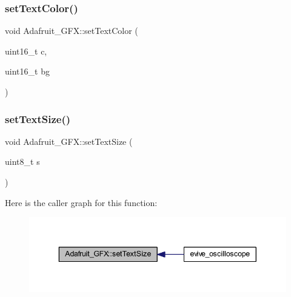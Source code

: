\subsubsection{\texorpdfstring{set\+Text\+Color()}{setTextColor()}\hspace{0.1cm}{\footnotesize\ttfamily [2/2]}}
{\footnotesize\ttfamily void Adafruit\+\_\+\+G\+F\+X\+::set\+Text\+Color (\begin{DoxyParamCaption}\item[{uint16\+\_\+t}]{c,  }\item[{uint16\+\_\+t}]{bg }\end{DoxyParamCaption})}

\mbox{\label{class_adafruit___g_f_x_a39eb4a8a2c9fa4ab7d58ceffd19535d5}} 
\subsubsection{\texorpdfstring{set\+Text\+Size()}{setTextSize()}}
{\footnotesize\ttfamily void Adafruit\+\_\+\+G\+F\+X\+::set\+Text\+Size (\begin{DoxyParamCaption}\item[{uint8\+\_\+t}]{s }\end{DoxyParamCaption})}

Here is the caller graph for this function\+:
\nopagebreak
\begin{figure}[H]
\begin{center}
\leavevmode
\includegraphics[width=343pt]{d9/d97/class_adafruit___g_f_x_a39eb4a8a2c9fa4ab7d58ceffd19535d5_icgraph}
\end{center}
\end{figure}
\mbox{\label{class_adafruit___g_f_x_aeeacd62bf26f3e7abbdc4b5b50faa6fa}} 
